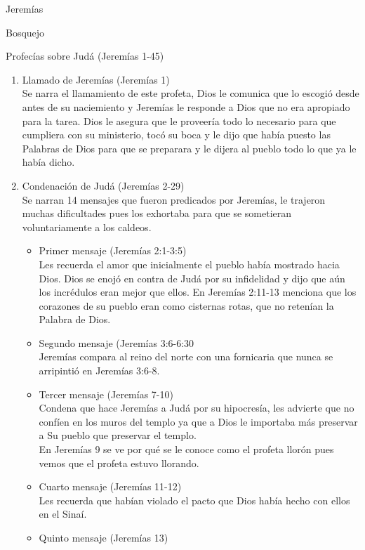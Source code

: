 \begin{section}{Jeremías}
\begin{itemize}
	\end{itemize}
	\begin{subsection}{Bosquejo}
		\begin{subsubsection}{Profecías sobre Judá (Jeremías 1-45)}
			\begin{enumerate}
				\item Llamado de Jeremías (Jeremías 1)\\
					Se narra el llamamiento de este profeta, Dios le comunica que lo escogió desde antes de su naciemiento y Jeremías le responde a Dios que no era apropiado para la tarea. Dios le asegura que le proveería todo lo necesario para que cumpliera con su ministerio, tocó su boca y le dijo que había puesto las Palabras de Dios para que se preparara y le dijera al pueblo todo lo que ya le había dicho.
				\item Condenación de Judá (Jeremías 2-29)\\
					Se narran 14 mensajes que fueron predicados por Jeremías, le trajeron muchas dificultades pues los exhortaba para que se sometieran voluntariamente a los caldeos. 
					\begin{itemize}
						\item Primer mensaje (Jeremías 2:1-3:5)\\
							Les recuerda el amor que inicialmente el pueblo había mostrado hacia Dios. Dios se enojó en contra de Judá por su infidelidad y dijo que aún los incrédulos eran mejor que ellos. En Jeremías 2:11-13 menciona que los corazones de su pueblo eran como cisternas rotas, que  no retenían la Palabra de Dios. 
						\item Segundo mensaje (Jeremías 3:6-6:30\\
							Jeremías compara al reino del norte con una fornicaria que nunca se arripintió en Jeremías 3:6-8. 
						\item Tercer mensaje (Jeremías 7-10)\\
							Condena que hace Jeremías a Judá por su hipocresía, les advierte que no confíen en los muros del templo ya que a Dios le importaba más preservar a Su pueblo que preservar el templo.\\
							En Jeremías 9 se ve por qué se le conoce como el profeta llorón pues vemos que el profeta estuvo llorando.
						\item Cuarto mensaje (Jeremías 11-12)\\
							Les recuerda que habían violado el pacto que Dios había hecho con ellos en el Sinaí. 
						\item Quinto mensaje (Jeremías 13)\\

\end{itemize}
\end{enumerate}
\end{subsubsection}
\end{subsection}
\end{section}
